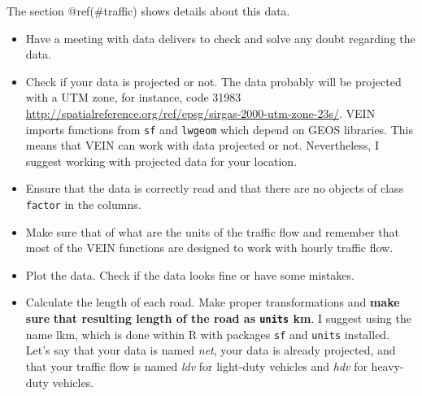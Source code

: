 \documentclass[12pt,graybox,envcountchap,sectrefs]{krantz}
\makeatletter
\newenvironment{Shaded}{\begin{snugshade}}{\end{snugshade}}
\newcommand{\KeywordTok}[1]{\textcolor[rgb]{0.13,0.29,0.53}{\textbf{#1}}}
\newcommand{\DataTypeTok}[1]{\textcolor[rgb]{0.13,0.29,0.53}{#1}}
\newcommand{\StringTok}[1]{\textcolor[rgb]{0.31,0.60,0.02}{#1}}
\newcommand{\CommentTok}[1]{\textcolor[rgb]{0.56,0.35,0.01}{\textit{#1}}}
\newcommand{\OperatorTok}[1]{\textcolor[rgb]{0.81,0.36,0.00}{\textbf{#1}}}
\newcommand{\ErrorTok}[1]{\textcolor[rgb]{0.64,0.00,0.00}{\textbf{#1}}}
\newcommand{\NormalTok}[1]{#1}
\providecommand{\tightlist}{%
  \setlength{\itemsep}{0pt}\setlength{\parskip}{0pt}}
\newenvironment{kframe}{%
\medskip{}
\setlength{\fboxsep}{.8em}
 \def\at@end@of@kframe{}%
 \ifinner\ifhmode%
  \def\at@end@of@kframe{\end{minipage}}%
  \begin{minipage}{\columnwidth}%
 \fi\fi%
 \def\FrameCommand##1{\hskip\@totalleftmargin \hskip-\fboxsep
 \colorbox{shadecolor}{##1}\hskip-\fboxsep
     \hskip-\linewidth \hskip-\@totalleftmargin \hskip\columnwidth}%
 \MakeFramed {\advance\hsize-\width
   \@totalleftmargin\z@ \linewidth\hsize
   \@setminipage}}%
 {\par\unskip\endMakeFramed%
 \at@end@of@kframe}
\renewenvironment{Shaded}{\begin{kframe}}{\end{kframe}}
\theoremstyle{definition}
\theoremstyle{definition}
\theoremstyle{definition}
\theoremstyle{remark}
\makeatother
\begin{document}
The section @ref(\#traffic) shows details about this data.

\begin{itemize}
\tightlist
\item
  Have a meeting with data delivers to check and solve any doubt
  regarding the data.
\item
  Check if your data is projected or not. The data probably will be
  projected with a UTM zone, for instance, code 31983
  \url{http://spatialreference.org/ref/epsg/sirgas-2000-utm-zone-23s/}.
  VEIN imports functions from \texttt{sf} and \texttt{lwgeom} which
  depend on GEOS libraries. This means that VEIN can work with data
  projected or not. Nevertheless, I suggest working with projected data
  for your location.
\item
  Ensure that the data is correctly read and that there are no objects
  of class \texttt{factor} in the columns.
\item
  Make sure that of what are the units of the traffic flow and remember
  that most of the VEIN functions are designed to work with hourly
  traffic flow.
\item
  Plot the data. Check if the data looks fine or have some mistakes.
\item
  Calculate the length of each road. Make proper transformations and
  \textbf{make sure} \textbf{that resulting length of the road as
  \texttt{units} km}. I suggest using the name lkm, which is done within
  R with packages \texttt{sf} and \texttt{units} installed. Let's say
  that your data is named \emph{net}, your data is already projected,
  and that your traffic flow is named \emph{ldv} for light-duty vehicles
  and \emph{hdv} for heavy-duty vehicles.
\end{itemize}

\begin{Shaded}
\end{Shaded}
\end{document}
